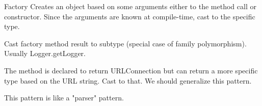 \begin{pattern}{Factory}
Creates an object based on some arguments either to the method call or
constructor.
Since the arguments are known at compile-time, cast to the specific type.

Cast factory method result to subtype (special case of family polymorphism).
Usually Logger.getLogger.

The method is declared to return URLConnection but can return a more specific type based on the URL string.
Cast to that.
We should generalize this pattern.

This pattern is like a "parser" pattern.
\end{pattern}